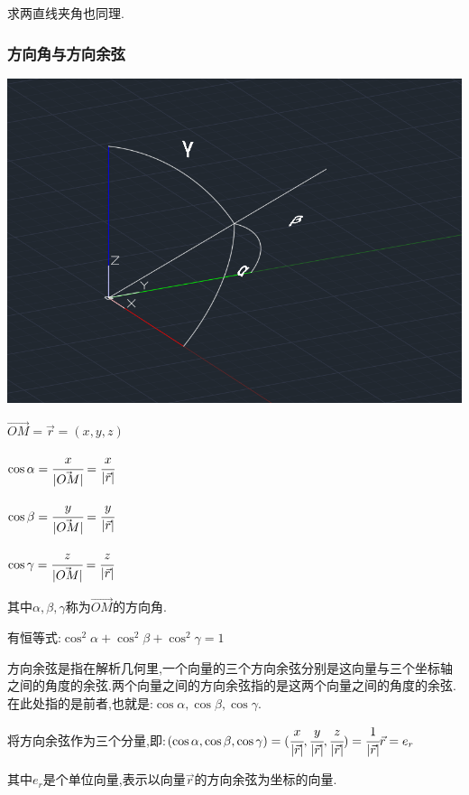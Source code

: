 \documentclass[UTF8,12pt]{ctexbook}
\begin{document}
{{{{\begin{itemize}
{              求两直线夹角也同理.
              }
      \end{itemize}
    }%

    \subsubsection{方向角与方向余弦}{
      \begin{center}
        \includegraphics[scale = 0.5]{resources/directionAngle.png}
      \end{center}

      $\vec{OM} = \vec{r} = (x,y,z)$

      $\cos\alpha = \cfrac{x}{|\vec{OM}|} = \cfrac{x}{|\vec{r}|}$

      $\cos\beta = \cfrac{y}{|\vec{OM}|} = \cfrac{y}{|\vec{r}|}$

      $\cos\gamma = \cfrac{z}{|\vec{OM}|} = \cfrac{z}{|\vec{r}|}$

      其中$\alpha,\beta,\gamma$称为$\vec{OM}$的方向角.

      有恒等式:$\cos^2\alpha + \cos^2\beta + \cos^2\gamma = 1$

      方向余弦是指在解析几何里,一个向量的三个方向余弦分别是这向量与三个坐标轴之间的角度的余弦.两个向量之间的方向余弦指的是这两个向量之间的角度的余弦.在此处指的是前者,也就是:$\cos\alpha,\cos\beta,\cos\gamma$.

      将方向余弦作为三个分量,即:$(\cos\alpha,\cos\beta,\cos\gamma) = (\cfrac{x}{|\vec{r}|}, \cfrac{y}{|\vec{r}|}, \cfrac{z}{|\vec{r}|}) = \cfrac{1}{|\vec{r}|}\vec{r} = e_r$

      其中$e_r$是个单位向量,表示以向量$\vec{r}$的方向余弦为坐标的向量.

}}}}
\end{document}

